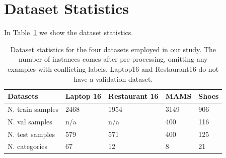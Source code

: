 \documentclass[11pt]{article}
\begin{document}
\section{Dataset Statistics}
\label{sec:appendix:dataset_statistics}
In Table~\ref{tab:datasets} we show the dataset statistics.
\begin{table}[h]
\centering
\begin{tabular}{lllll}
\hline
Datasets        & Laptop 16 & Restaurant 16 & MAMS & Shoes \\ \hline
N. train samples     &  2468  & 1954 & 3149 & 906   \\
N. val samples       &  n/a   & n/a & 400 & 116    \\
N. test samples      &  579   & 571 & 400 & 125   \\
N. categories        &  67    & 12  & 8   & 21  \\ \hline
\end{tabular}
\caption{Dataset statistics for the four datasets employed in our study. The number of instances comes after pre-processing, omitting any examples with conflicting labels. Laptop16 and Restaurant16 do not have a validation dataset.}
\label{tab:datasets}
\end{table}




\end{document}
